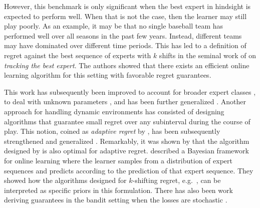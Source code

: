 \documentclass{article}
\newcommand{\sC}{\mathscr C}
\newcommand{\set}[2][]{#1 \{ #2 #1 \} }
\begin{document}
However, this benchmark is only significant when the best expert in
hindsight is expected to perform well. When that is not the case, then
the learner may still play poorly. As an example, it may be that no
single baseball team has performed well over all seasons in the past
few years. Instead, different teams may have dominated over different
time periods. This has led to a definition of regret against the best
sequence of experts with $k$ shifts in the seminal work of
\cite{HerbsterWarmuth1998} on \emph{tracking the best expert}.  The
authors showed that there exists an efficient online learning
algorithm for this setting with favorable regret guarantees.

This work has subsequently been improved to account for broader expert
classes \citep{GyorgyLinderLugosi2012}, to deal with unknown
parameters \citep{MonteleoniJaakkola2003}, and has been further
generalized \citep{CesaBianchiGaillardLugosiStoltz2012, Vovk1999}.
Another approach for handling dynamic environments has consisted of
designing algorithms that guarantee small regret over any subinterval
during the course of play. This notion, coined as \emph{adaptive
  regret} by \cite{HazanSeshadhri2009}, has been subsequently
strengthened and generalized \citep{DanielyGonenShalevShwartz2015,
  AdamskiyKoolenChernovVovk2012}.  Remarkably, it was shown by
\cite{AdamskiyKoolenChernovVovk2012} that the algorithm designed by
\cite{HerbsterWarmuth1998} is also optimal for adaptive regret.
\cite{KoolenDeRooij2013} described a Bayesian framework for online
learning where the learner samples from a distribution of expert
sequences and predicts according to the prediction of that expert
sequence. They showed how the algorithms designed for $k$-shifting
regret, e.g.\ \citep{HerbsterWarmuth1998, MonteleoniJaakkola2003}, can
be interpreted as specific priors in this formulation.  There has also
been work deriving guarantees in the bandit setting when the losses
are stochastic \citep{BesbesGurZeevi2014, WeiHongLu2016}.

\end{document}
